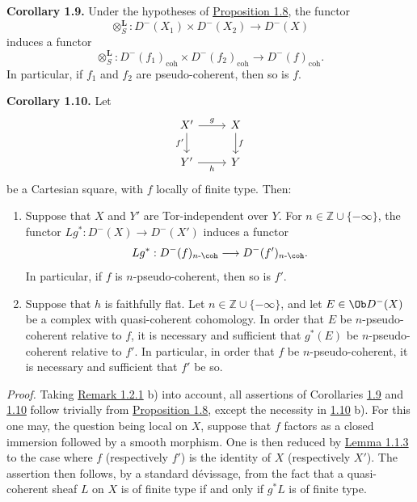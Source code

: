 \textbf{Corollary 1.9.} Under the hypotheses of \hyperlink{sga6.e03.prop.1-8}{Proposition 1.8}, the functor
\[
  \otimes_S^{\mathbf L}:D^{-}(X_1)\times D^{-}(X_2)\longrightarrow D^{-}(X)
\]
induces a functor
\[
  \otimes_S^{\mathbf L}:D^{-}(f_1)_{\mathrm{coh}}\times D^{-}(f_2)_{\mathrm{coh}}
  \longrightarrow D^{-}(f)_{\mathrm{coh}} .
\]
In particular, if \(f_1\) and \(f_2\) are pseudo-coherent, then so is \(f\).

\textbf{Corollary 1.10.} Let
\[
\begin{tikzcd}
X' \arrow[r,"g"] \arrow[d,"f'"'] & X \arrow[d,"f"]\\
Y' \arrow[r,"h"'] & Y
\end{tikzcd}
\]
be a Cartesian square, with \(f\) locally of finite type. Then:
\begin{enumerate}[label=\alph*)]
\item Suppose that \(X\) and \(Y'\) are Tor-independent over \(Y\). For \(n\in\mathbb Z\cup\{-\infty\}\), the functor \(Lg^*:D^{-}(X)\to D^{-}(X')\) induces a functor
\[
  Lg^*:D^{-}(f)_{n\text{-}\coh}\longrightarrow D^{-}(f')_{n\text{-}\coh}.
\]
In particular, if \(f\) is \(n\)-pseudo-coherent, then so is \(f'\).

\item Suppose that \(h\) is faithfully flat. Let \(n\in\mathbb Z\cup\{-\infty\}\), and let \(E\in\Ob D^{-}(X)\) be a complex with quasi-coherent cohomology. In order that \(E\) be \(n\)-pseudo-coherent relative to \(f\), it is necessary and sufficient that \(g^*(E)\) be \(n\)-pseudo-coherent relative to \(f'\). In particular, in order that \(f\) be \(n\)-pseudo-coherent, it is necessary and sufficient that \(f'\) be so.
\end{enumerate}

\emph{Proof.} Taking \hyperlink{sga6.e03.rem.1-2-1}{Remark 1.2.1} b) into account, all assertions of Corollaries \hyperlink{sga6.e03.cor.1-9}{1.9} and \hyperlink{sga6.e03.cor.1-10}{1.10} follow trivially from \hyperlink{sga6.e03.prop.1-8}{Proposition 1.8}, except the necessity in \hyperlink{sga6.e03.cor.1-10}{1.10} b). For this one may, the question being local on \(X\), suppose that \(f\) factors as a closed immersion followed by a smooth morphism. One is then reduced by \hyperlink{sga6.e03.lem.1-1-3}{Lemma 1.1.3} to the case where \(f\) (respectively \(f'\)) is the identity of \(X\) (respectively \(X'\)). The assertion then follows, by a standard dévissage, from the fact that a quasi-coherent sheaf \(L\) on \(X\) is of finite type if and only if \(g^*L\) is of finite type.

